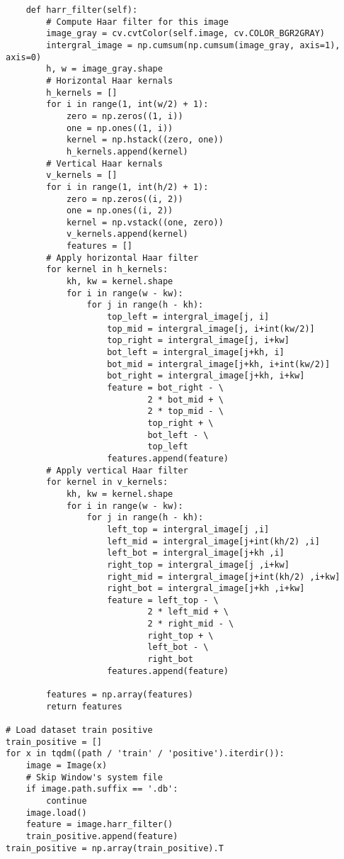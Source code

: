 \documentclass[11pt]{article}
\begin{document}
\begin{lstlisting}
    def harr_filter(self):
        # Compute Haar filter for this image
        image_gray = cv.cvtColor(self.image, cv.COLOR_BGR2GRAY)
        intergral_image = np.cumsum(np.cumsum(image_gray, axis=1), axis=0)
        h, w = image_gray.shape
        # Horizontal Haar kernals
        h_kernels = []
        for i in range(1, int(w/2) + 1):
            zero = np.zeros((1, i))
            one = np.ones((1, i))
            kernel = np.hstack((zero, one))
            h_kernels.append(kernel)
        # Vertical Haar kernals
        v_kernels = []
        for i in range(1, int(h/2) + 1):
            zero = np.zeros((i, 2))
            one = np.ones((i, 2))
            kernel = np.vstack((one, zero))
            v_kernels.append(kernel)
            features = []
        # Apply horizontal Haar filter
        for kernel in h_kernels:
            kh, kw = kernel.shape
            for i in range(w - kw):
                for j in range(h - kh):
                    top_left = intergral_image[j, i]
                    top_mid = intergral_image[j, i+int(kw/2)]
                    top_right = intergral_image[j, i+kw]
                    bot_left = intergral_image[j+kh, i]
                    bot_mid = intergral_image[j+kh, i+int(kw/2)]
                    bot_right = intergral_image[j+kh, i+kw]
                    feature = bot_right - \
                            2 * bot_mid + \
                            2 * top_mid - \
                            top_right + \
                            bot_left - \
                            top_left
                    features.append(feature)
        # Apply vertical Haar filter
        for kernel in v_kernels:
            kh, kw = kernel.shape
            for i in range(w - kw):
                for j in range(h - kh):
                    left_top = intergral_image[j ,i]
                    left_mid = intergral_image[j+int(kh/2) ,i]
                    left_bot = intergral_image[j+kh ,i]
                    right_top = intergral_image[j ,i+kw]
                    right_mid = intergral_image[j+int(kh/2) ,i+kw]
                    right_bot = intergral_image[j+kh ,i+kw]
                    feature = left_top - \
                            2 * left_mid + \
                            2 * right_mid - \
                            right_top + \
                            left_bot - \
                            right_bot
                    features.append(feature)

        features = np.array(features)
        return features

# Load dataset train positive
train_positive = []
for x in tqdm((path / 'train' / 'positive').iterdir()):
    image = Image(x)
    # Skip Window's system file 
    if image.path.suffix == '.db':
        continue
    image.load()
    feature = image.harr_filter()
    train_positive.append(feature)
train_positive = np.array(train_positive).T


\end{lstlisting}
\end{document}
